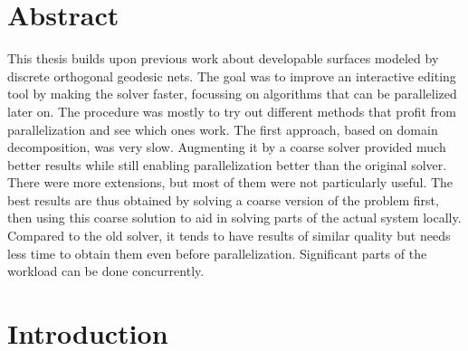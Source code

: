 \documentclass[a4paper,twoside,12pt,nochapterprefix]{scrbook}
\begin{document}
\chapter*{Abstract}\label{sec:abstract}
This thesis builds upon previous work about developable surfaces modeled by discrete orthogonal geodesic nets. The goal was to improve an interactive editing tool by making the solver faster, focussing on algorithms that can be parallelized later on. The procedure was mostly to try out different methods that profit from parallelization and see which ones work. The first approach, based on domain decomposition, was very slow. Augmenting it by a coarse solver provided much better results while still enabling parallelization better than the original solver. There were more extensions, but most of them were not particularly useful. The best results are thus obtained by solving a coarse version of the problem first, then using this coarse solution to aid in solving parts of the actual system locally. Compared to the old solver, it tends to have results of similar quality but needs less time to obtain them even before parallelization. Significant parts of the workload can be done concurrently.\newline


\tableofcontents

\cleardoublepage
{}
{}
\listoffigures

\cleardoublepage
{}
{}
\listoftables
\cleardoublepage

\renewcommand*{\chapterformat}{}

\chapter{Introduction}\label{sec:intro}
\end{document}
